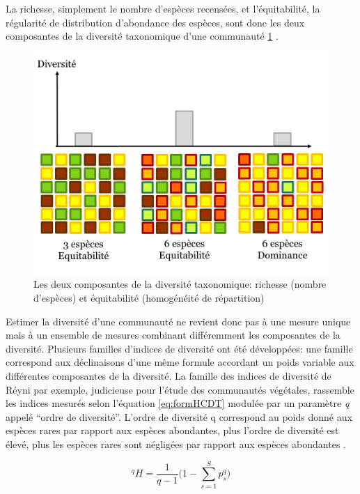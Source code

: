 \documentclass[
  11pt,
  french,
  A4paper,
  extrafontsizes,onecolumn,openright
  ]{memoir}
\begin{document}
La richesse, simplement le nombre d'espèces recensées, et
l'équitabilité, la régularité de distribution d'abondance des espèces,
sont donc les deux composantes de la diversité taxonomique d'une
communauté \ref{fig:RichEqu} \autocites{Whittaker1965}{Magurran2004}.

\begin{figure}

{\centering \includegraphics[width=0.6\linewidth]{ExternalFig/Fig_RichnessEquitability} 

}

\caption{Les deux composantes de la diversité taxonomique: richesse (nombre d'espèces) et équitabilité (homogénéité de répartition)}\label{fig:RichEqu}
\end{figure}

Estimer la diversité d'une communauté ne revient donc pas à une mesure
unique mais à un ensemble de mesures combinant différemment les
composantes de la diversité. Plusieurs familles d'indices de diversité
ont été développées: une famille correspond aux déclinaisons d'une même
formule accordant un poids variable aux différentes composantes de la
diversité. La famille des indices de diversité de Réyni par exemple,
judicieuse pour l'étude des communautés végétales, rassemble les indices
mesurés selon l'équation \eqref{eq:formHCDT} modulée par un paramètre
\emph{q} appelé ``ordre de diversité''. L'ordre de diversité q
correspond au poids donné aux espèces rares par rapport aux espèces
abondantes, plus l'ordre de diversité est élevé, plus les espèces rares
sont négligées par rapport aux espèces abondantes \autocite{Mendes2008}.

\begin{equation}
{^{q}H=\frac{1}{q-1}\Bigg(1-\displaystyle\sum_{s=1}^{S}p^q_s\Bigg) }
\label{eq:formHCDT}
\end{equation}
\end{document}
